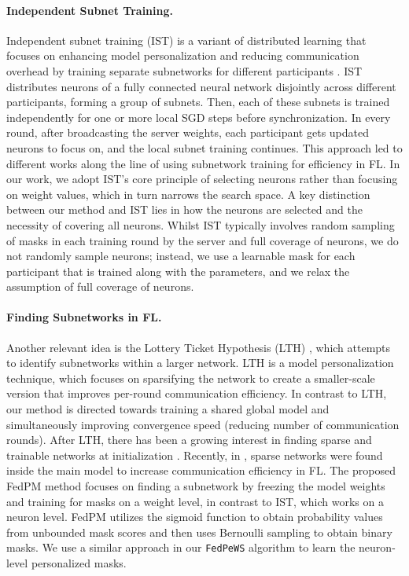 \documentclass{article}
\begin{document}
\paragraph{Independent Subnet Training.} Independent subnet training (IST) is a variant of distributed learning that focuses on enhancing model personalization and reducing communication overhead by training separate subnetworks for different participants \citep{yuan2022distributed}. IST distributes neurons of a fully connected neural network disjointly across different participants, forming a group of subnets. Then, each of these subnets is trained independently for one or more local SGD steps before synchronization. In every round, after broadcasting the server weights, each participant gets updated neurons to focus on, and the local subnet training continues. This approach led to different works along the line of using subnetwork training for efficiency \citep{horvath2021fjord, jiang2022prunefl, diao2020heterofl, nader2020feddropoutadaptive, alam2022fedrolex, li2021fedmask, mozaffari2021frl} in FL. In our work, we adopt IST's core principle of selecting neurons rather than focusing on weight values, which in turn narrows the search space. A key distinction between our method and IST lies in how the neurons are selected and the necessity of covering all neurons. Whilst IST typically involves random sampling of masks in each training round by the server and full coverage of neurons, we do not randomly sample neurons; instead, we use a learnable mask for each participant that is trained along with the parameters, and we relax the assumption of full coverage of neurons. 

\paragraph{Finding Subnetworks in FL.} Another relevant idea is the Lottery Ticket Hypothesis (LTH) \citep{frankle2018lottery}, which attempts to identify subnetworks within a larger network. LTH is a model personalization technique, which focuses on sparsifying the network to create a smaller-scale version that improves per-round communication efficiency. In contrast to LTH, our method is directed towards training a shared global model and simultaneously improving convergence speed (reducing number of communication rounds). After LTH, there has been a growing interest in finding sparse and trainable networks at initialization \citep{mellor2021naswot, ji2021dynamic, li2020lotteryfl}. Recently, in \citep{isik2022sparse}, sparse networks were found inside the main model to increase communication efficiency in FL. The proposed FedPM method focuses on finding a subnetwork by freezing the model weights and training for masks on a weight level, in contrast to IST, which works on a neuron level. FedPM utilizes the sigmoid function to obtain probability values from unbounded mask scores and then uses Bernoulli sampling to obtain binary masks. We use a similar approach in our \texttt{FedPeWS} algorithm to learn the neuron-level personalized masks. 
\end{document}
